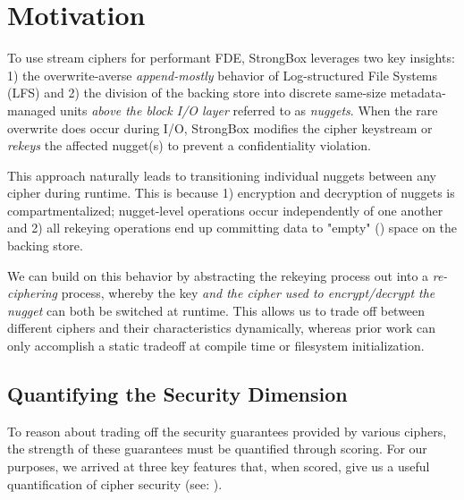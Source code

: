 \section{Motivation}\label{sec:motivation}


To use stream ciphers for performant FDE, StrongBox leverages two key insights:
1) the overwrite-averse \emph{append-mostly} behavior of Log-structured File
Systems (LFS) and 2) the division of the backing store into discrete same-size
metadata-managed units \emph{above the block I/O layer} referred to as
\emph{nuggets}. When the rare overwrite does occur during I/O, StrongBox
modifies the cipher keystream or \emph{rekeys} the affected nugget(s) to prevent
a confidentiality violation.

This approach naturally leads to transitioning individual nuggets between any
cipher during runtime. This is because 1) encryption and decryption of nuggets
is compartmentalized; nugget-level operations occur independently of one another
and 2) all rekeying operations end up committing data to "empty"
() space on the backing store.

We can build on this behavior by abstracting the rekeying process out into a
\emph{re-ciphering} process, whereby the key \emph{and the cipher used to
encrypt/decrypt the nugget} can both be switched at runtime. This allows us to
trade off between different ciphers and their characteristics dynamically,
whereas prior work can only accomplish a static tradeoff at compile time or
filesystem initialization.

\subsection{Quantifying the Security Dimension}

To reason about trading off the security guarantees provided by various ciphers,
the strength of these guarantees must be quantified through scoring. For our
purposes, we arrived at three key features that, when scored, give us a useful
quantification of cipher security (see: ).

